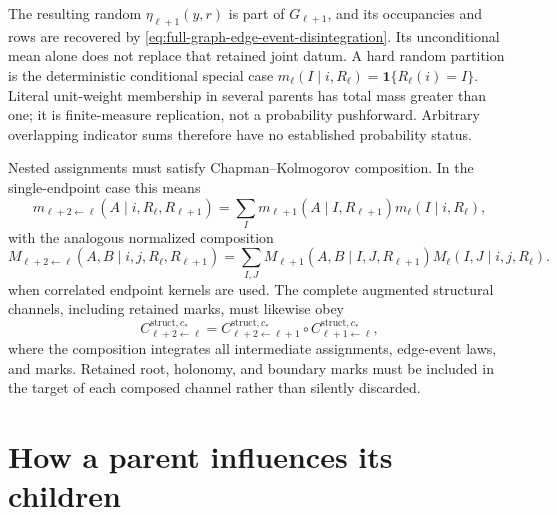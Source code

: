 The resulting random $\eta_{\ell+1}(y,r)$ is part of $G_{\ell+1}$, and its
occupancies and rows are recovered by
\eqref{eq:full-graph-edge-event-disintegration}. Its unconditional mean
alone does not replace that retained joint datum. A hard
random partition is the deterministic conditional special case
$m_\ell(I\mid i,R_\ell)=\mathbf 1\{R_\ell(i)=I\}$. Literal unit-weight
membership in several parents has total mass greater than one; it is
finite-measure replication, not a probability pushforward. Arbitrary
overlapping indicator sums therefore have no established probability status.

Nested assignments must satisfy Chapman--Kolmogorov composition. In the
single-endpoint case this means
\begin{equation}
m_{\ell+2\leftarrow\ell}(A\mid i,R_\ell,R_{\ell+1})
=\sum_I m_{\ell+1}(A\mid I,R_{\ell+1})
m_\ell(I\mid i,R_\ell),
\label{eq:full-graph-membership-composition}
\end{equation}
with the analogous normalized composition
\begin{equation}
M_{\ell+2\leftarrow\ell}(A,B\mid i,j,R_\ell,R_{\ell+1})
=\sum_{I,J}M_{\ell+1}(A,B\mid I,J,R_{\ell+1})
M_\ell(I,J\mid i,j,R_\ell).
\label{eq:full-graph-joint-membership-composition}
\end{equation}
when correlated endpoint kernels are used. The complete augmented structural
channels, including retained marks, must likewise obey
\begin{equation}
C^{\mathrm{struct},c_*}_{\ell+2\leftarrow\ell}
=C^{\mathrm{struct},c_*}_{\ell+2\leftarrow\ell+1}
\circ C^{\mathrm{struct},c_*}_{\ell+1\leftarrow\ell},
\label{eq:full-graph-structural-channel-composition}
\end{equation}
where the composition integrates all intermediate assignments, edge-event
laws, and marks. Retained root, holonomy, and boundary marks must be included
in the target of each composed channel rather than silently discarded.

\section{How a parent influences its children}
\label{sec:full-graph-vfe-downward}

